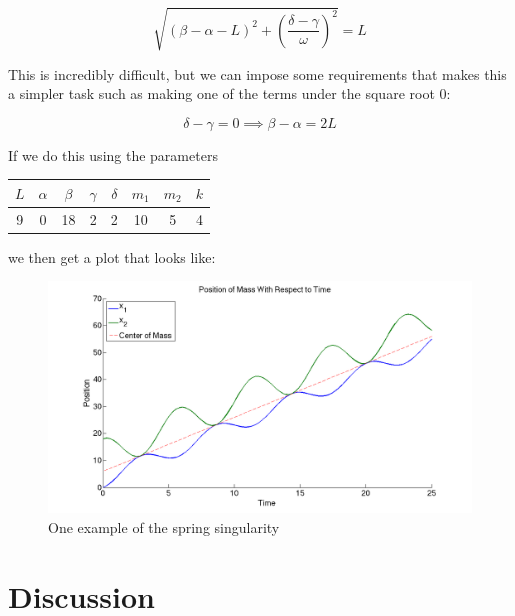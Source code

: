 \documentclass[11pt, oneside]{article}   	%
\begin{document}
$$\sqrt{(\beta - \alpha -L)^2 + \left(\frac{\delta - \gamma}{\omega}\right)^2}=L$$

This is incredibly difficult, but we can impose some requirements that makes this a simpler task such as making one of the terms under the square root $0$:

$$\delta - \gamma = 0 \implies \beta - \alpha = 2L$$

If we do this using the parameters

\begin{center}

\begin{tabular}{| c | c | c | c | c | c | c | c |}

\hline

$L$ & $\alpha$ & $\beta$ & $\gamma$ & $\delta$ & $m_1$ & $m_2$ & $k$ \\

\hline

 9 & 0 & 18 & 2 & 2 & 10 & 5 & 4\\

\hline

\end{tabular}

\end{center}

we then get a plot that looks like: \\

\begin{figure}[h!]
\centering \includegraphics[scale=0.3]{spring_sing}
\caption{\label{singularity}One example of the spring singularity}
\end{figure}



\section{Discussion}
\end{document}
